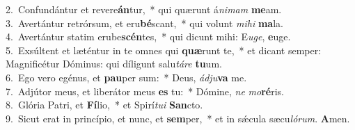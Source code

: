 {2.~}Confundántur et revere\textbf{án}tur,~* qui quærunt á\textit{ni}\textit{mam} \textbf{me}am.\\
{3.~}Avertántur retrórsum, et eru\textbf{bé}scant,~* qui volunt \textit{mi}\textit{hi} \textbf{ma}la.\\
{4.~}Avertántur statim erube\textbf{scén}tes,~* qui dicunt mihi: E\textit{u}\textit{ge}, \textbf{e}uge.\\
{5.~}Exsúltent et læténtur in te omnes qui \textbf{quæ}runt te,~* et dicant semper: Magnificétur Dóminus: qui díligunt salu\textit{tá}\textit{re} \textbf{tu}um.\\
{6.~}Ego vero egénus, et \textbf{pau}per sum:~* Deus, \textit{ád}\textit{ju}\textbf{va} me.\\
{7.~}Adjútor meus, et liberátor meus \textbf{es} tu:~* Dómine, \textit{ne} \textit{mo}\textbf{ré}ris.\\
{8.~}Glória Patri, et \textbf{Fí}lio,~* et Spirí\textit{tu}\textit{i} \textbf{San}cto.\\
{9.~}Sicut erat in princípio, et nunc, et \textbf{sem}per,~* et in sǽcula sæcu\textit{ló}\textit{rum}. \textbf{A}men.\\
